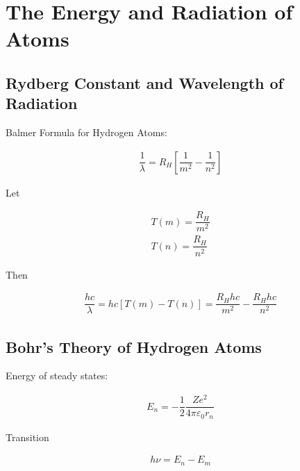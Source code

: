 
\chapter{The Energy and Radiation of Atoms}

\section{Rydberg Constant and Wavelength of Radiation}

Balmer Formula for Hydrogen Atoms:

\begin{equation*}
  \begin{aligned}
    \dfrac{1}{\lambda} = R_H \left[ \dfrac{1}{m^2} - \dfrac{1}{n^2}   \right] 
  \end{aligned}
\end{equation*}

Let

\begin{equation*}
  \begin{aligned}
    T(m) = \dfrac{R_H}{m^2} \\
    T(n) = \dfrac{R_H}{n^2} 
  \end{aligned}
\end{equation*}

Then

\begin{equation*}
  \begin{aligned}
    \dfrac{h c}{\lambda} = hc \left[ T (m) - T (n) \right] = \dfrac{R_H h c}{m^2} - \dfrac{R_H h c}{n^2}  
  \end{aligned}
\end{equation*}

\section{Bohr's Theory of Hydrogen Atoms}

Energy of steady states:

\begin{equation*}
  \begin{aligned}
    E_n = - \dfrac{1}{2} \dfrac{Z e^2}{4 \pi \varepsilon_0 r_n}  
  \end{aligned}
\end{equation*}

Transition

\begin{equation*}
  \begin{aligned}
    h \nu = E_n - E_m
  \end{aligned}
\end{equation*}

